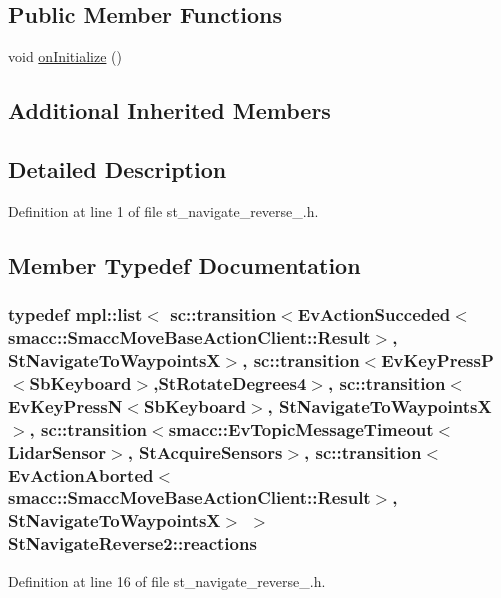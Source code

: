 \subsection*{Public Member Functions}
\begin{DoxyCompactItemize}
\item 
void \hyperlink{structStNavigateReverse2_ac5c81b2766cc7716242d6f71c8b0ea8c}{on\+Initialize} ()
\end{DoxyCompactItemize}
\subsection*{Additional Inherited Members}


\subsection{Detailed Description}


Definition at line 1 of file st\+\_\+navigate\+\_\+reverse\+\_.\+h.



\subsection{Member Typedef Documentation}
\subsubsection[{\texorpdfstring{reactions}{reactions}}]{\setlength{\rightskip}{0pt plus 5cm}typedef mpl\+::list$<$ sc\+::transition$<$Ev\+Action\+Succeded$<$smacc\+::\+Smacc\+Move\+Base\+Action\+Client\+::\+Result$>$, {\bf St\+Navigate\+To\+WaypointsX}$>$, sc\+::transition$<$Ev\+Key\+PressP$<$Sb\+Keyboard$>$,{\bf St\+Rotate\+Degrees4}$>$, sc\+::transition$<$Ev\+Key\+PressN$<$Sb\+Keyboard$>$, {\bf St\+Navigate\+To\+WaypointsX}$>$, sc\+::transition$<${\bf smacc\+::\+Ev\+Topic\+Message\+Timeout}$<${\bf Lidar\+Sensor}$>$, {\bf St\+Acquire\+Sensors}$>$, sc\+::transition$<$Ev\+Action\+Aborted$<$smacc\+::\+Smacc\+Move\+Base\+Action\+Client\+::\+Result$>$, {\bf St\+Navigate\+To\+WaypointsX}$>$ $>$ {\bf St\+Navigate\+Reverse2\+::reactions}}\hypertarget{structStNavigateReverse2_a8cc76155c9ec823276e4546f1ca184ce}{}\label{structStNavigateReverse2_a8cc76155c9ec823276e4546f1ca184ce}


Definition at line 16 of file st\+\_\+navigate\+\_\+reverse\+\_.\+h.



